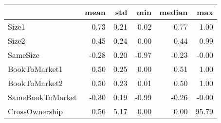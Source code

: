 \begin{tabular}{lrrrrr}
\toprule
{} &  mean &   std &   min &  median &    max \\
\midrule
Size1            &  0.73 &  0.21 &  0.02 &    0.77 &   1.00 \\
Size2            &  0.45 &  0.24 &  0.00 &    0.44 &   0.99 \\
SameSize         & -0.28 &  0.20 & -0.97 &   -0.23 &  -0.00 \\
BookToMarket1    &  0.50 &  0.25 &  0.00 &    0.51 &   1.00 \\
BookToMarket2    &  0.50 &  0.23 &  0.01 &    0.50 &   1.00 \\
SameBookToMarket & -0.30 &  0.19 & -0.99 &   -0.26 &  -0.00 \\
CrossOwnership   &  0.56 &  5.17 &  0.00 &    0.00 &  95.79 \\
\bottomrule
\end{tabular}
